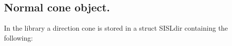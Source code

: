 

\subsection{Normal cone object.} \label{sec:dcone}

In the library a direction cone is stored in a struct SISLdir
containing the following:


\pgsbreak


